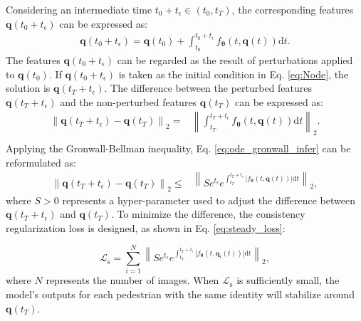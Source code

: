 \documentclass[12pt]{spieman}  %
\begin{document}
\begin{spacing}{2}
		Considering an intermediate time $t_0+t_{\epsilon} \in (t_0, t_T)$, the corresponding features $\boldsymbol{q}(t_0+t_{\epsilon} )$ can be expressed as:
		\begin{equation}
			\label{eq:ode_intermeidate}
			\begin{aligned}
				\boldsymbol{q}(t_0+t_{\epsilon} ) = \boldsymbol{q}(t_0) + \int_{t_0}^{t_0+t_{\epsilon}}f_{\boldsymbol{\theta}}(t, \boldsymbol q(t))\mathrm{d}t.
			\end{aligned}
		\end{equation}
		The features $\boldsymbol{q}(t_0+t_{\epsilon} )$ can be regarded as the result of perturbations applied to $\boldsymbol{q}(t_0)$. If $\boldsymbol{q}(t_0+t_{\epsilon} )$ is taken as the initial condition in Eq. \eqref{eq:Node}, the solution is $\boldsymbol{q}(t_T + t_{\epsilon})$. The difference between the perturbed features $\boldsymbol{q}(t_T+t_{\epsilon})$ and the non-perturbed features $\boldsymbol{q}(t_T)$ can be expressed as:
		\begin{equation}
			\label{eq:ode_gronwall_infer}
			\begin{aligned}
				\left\| \boldsymbol{q}(t_T+t_{\epsilon})-\boldsymbol q(t_T)\right\|_{2}=&\left\| \int_{t_T}^{t_T+t_{\epsilon}}f_{\boldsymbol{\theta}}(t, \boldsymbol q(t))\mathrm{d}t\right\|_{2}. \\
			\end{aligned}
		\end{equation}
		Applying the Gronwall-Bellman inequality, Eq. \eqref{eq:ode_gronwall_infer} can be reformulated as:
		\begin{equation}
			\label{eq:ode_gronwall_infer2}
			\begin{aligned}
				\left\| \boldsymbol{q}(t_T+t_{\epsilon})-\boldsymbol q(t_T)\right\|_{2}
				\leq&\left\|Se^{t_{\epsilon}}e^{\int_{t_T}^{t_T+t_{\epsilon}}\left|f_{\boldsymbol{\theta}}(t, \boldsymbol q(t))\right| \mathrm{d}t}\right\|_{2},
			\end{aligned}
		\end{equation}
		where $S>0$ represents a hyper-parameter used to adjust the difference between $\boldsymbol{q}(t_T+t_{\epsilon})$ and $\boldsymbol{q}(t_T)$. To minimize the difference, the consistency regularization loss is designed, as shown in Eq. \eqref{eq:steady_loss}:
		
		\begin{equation}
			\label{eq:steady_loss}
			\mathcal{L}_{\text{s}}=\sum_{i=1}^{N}\left\|S e^{t_{\epsilon}}e^{\int_{t_T}^{t_T+t_{\epsilon}}\left|f_{\boldsymbol{\theta}}(t, \boldsymbol q_i(t))\right| \mathrm{d}t}\right\|_{2},
		\end{equation}
		where $N$ represents the number of images. When $\mathcal{L}_{\text{s}}$ is sufficiently small, the model's outputs for each pedestrian with the same identity will stabilize around $\boldsymbol{q}(t_T)$.
		

\end{spacing}
\end{document}
